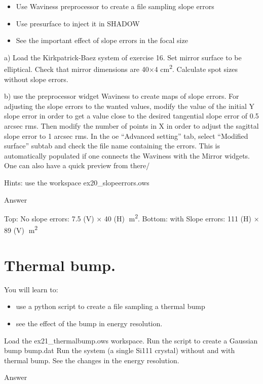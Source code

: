\documentclass[]{article}
\providecommand{\tightlist}{%
  \setlength{\itemsep}{0pt}\setlength{\parskip}{0pt}}
\begin{document}
\begin{itemize}
\tightlist
\item
  Use Waviness preprocessor to create a file sampling slope errors
\item
  Use presurface to inject it in SHADOW
\item
  See the important effect of slope errors in the focal size 
\end{itemize}

a) Load the Kirkpatrick-Baez system of exercise 16. Set mirror surface
to be elliptical. Check that mirror dimensions are 40×4
cm\textsuperscript{2}. Calculate spot sizes without slope errors.

b) use the preprocessor widget Waviness to create maps of slope errors.
For adjusting the slope errors to the wanted values, modify the value of
the initial Y slope error in order to get a value close to the desired
tangential slope error of 0.5 arcsec rms. Then modify the number of
points in X in order to adjust the sagittal slope error to 1 arcsec rms.
In the oe ``Advanced setting'' tab, select ``Modified surface'' subtab
and check the file name containing the errors. This is automatically
populated if one connects the Waviness with the Mirror widgets. One can
also have a quick preview from there/

Hints: use the workspace ex20\_slopeerrors.ows

Answer

Top: No slope errors: 7.5 (V) × 40 (H) m\textsuperscript{2}. Bottom:
with Slope errors: 111 (H) × 89 (V) m\textsuperscript{2}

\section{Thermal bump.}\label{thermal-bump.}

You will learn to:

\begin{itemize}
\tightlist
\item
  use a python script to create a file sampling a thermal bump
\item
  see the effect of the bump in energy resolution. 
\end{itemize}

Load the ex21\_thermalbump.ows workspace. Run the script to create a
Gaussian bump bump.dat Run the system (a single Si111 crystal) without
and with thermal bump. See the changes in the energy resolution.

Answer
\end{document}
